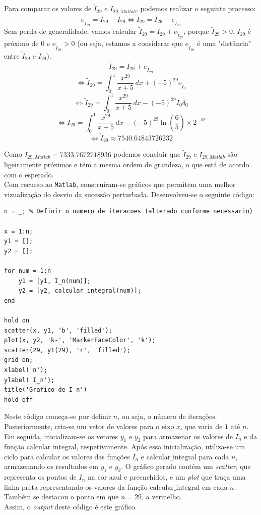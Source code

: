 \documentclass[12pt,a4paper]{article}
\begin{document}
Para comparar os valores de  $\tilde{I}_{29}$ e $I_{29,Matlab}$, podemos realizar o seguinte processo:
\[
e_{\tilde{I}_{29}}=I_{29}-\tilde{I}_{29}\Leftrightarrow \tilde{I}_{29}=I_{29}-e_{\tilde{I}_{29}}
\]
Sem perda de generalidade, vamos calcular $\tilde{I}_{29}=I_{29}+e_{\tilde{I}_{29}}$, porque $\tilde{I}_{29}>0$, $I_{29}$ é próximo de $0$ e $e_{\tilde{I}_{29}}>0$ (ou seja, estamos a considerar que $e_{\tilde{I}_{29}}$ é uma "distância" entre $\tilde{I}_{29}$ e $I_{29}$).
\[
\tilde{I}_{29}=I_{29}+e_{\tilde{I}_{29}}
\]
\[
\Leftrightarrow \tilde{I}_{29}=\int_{0}^{1} \frac{x^{29}}{x+5} \, dx + (-5)^{29}e_{\tilde{I}_{0}} 
\]\[
\Leftrightarrow \tilde{I}_{29}=\int_{0}^{1} \frac{x^{29}}{x+5} \, dx - (-5)^{29}I_0\delta_0 
\]\[
\Leftrightarrow \tilde{I}_{29}=\int_{0}^{1} \frac{x^{29}}{x+5} \, dx - (-5)^{29}\ln{\left(\frac{6}{5}\right)}\times2^{-52}
\]\[
\Leftrightarrow \tilde{I}_{29}\approx 7540.64843726232
\]

Como $I_{29,Matlab} = 7333.7672718936$ podemos concluir que $\tilde{I}_{29}$ e $I_{29,Matlab}$ são ligeiramente próximos e têm a mesma ordem de grandeza, o que está de acordo com o esperado.\\


Com recurso ao \texttt{Matlab}, construiram-se gráficos que permitem uma melhor vizualização do desvio da sucessão perturbada. Desenvolveu-se o seguinte código:


    \begin{lstlisting}
n = _; % Definir o numero de iteracoes (alterado conforme necessario)

x = 1:n;
y1 = [];
y2 = [];

for num = 1:n
    y1 = [y1, I_n(num)];
    y2 = [y2, calcular_integral(num)];
end

hold on
scatter(x, y1, 'b', 'filled'); 
plot(x, y2, 'k-', 'MarkerFaceColor', 'k');
scatter(29, y1(29), 'r', 'filled');
grid on;
xlabel('n'); 
ylabel('I_n');
title('Grafico de I_n')
hold off
    \end{lstlisting}

\vspace{0.5cm}

Neste código começa-se por definir \( n \), ou seja, o número de iterações. Posteriormente, cria-se um vetor de valores para o eixo \( x \), que varia de \( 1 \) até \( n \). Em seguida, inicializam-se os vetores \( y_1 \) e \( y_2 \) para armazenar os valores de \( I_n \) e da função \( \text{calcular\_integral} \), respetivamente. Após essa inicialização, utiliza-se um ciclo para calcular os valores das funções \( I_n \) e \( \text{calcular\_integral} \) para cada \( n \), armazenando os resultados em \( y_1 \) e \( y_2 \). O gráfico gerado contém um \textit{scatter}, que representa os pontos de \( I_n \) na cor azul e preenchidos, e um \textit{plot} que traça uma linha preta representando os valores da função \( \text{calcular\_integral} \) em cada \( n \). Também se destacou o ponto em que \(n=29\), a vermelho. \\
Assim, o \textit{output} deste código é este gráfico.
\end{document}
